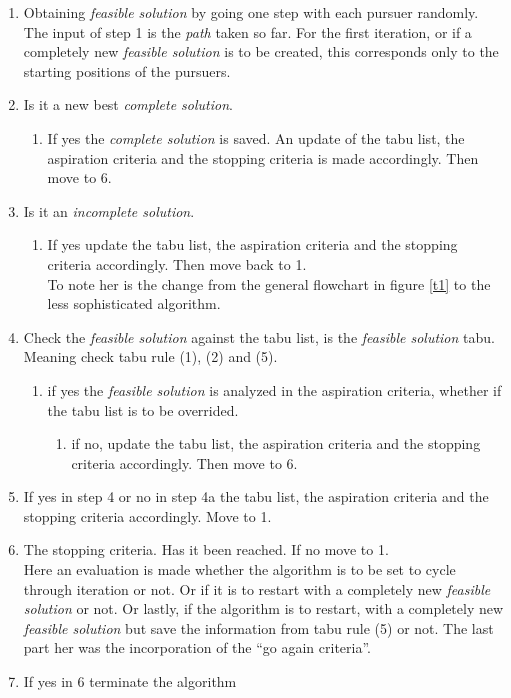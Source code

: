 \begin{enumerate}
\item{}Obtaining \emph{feasible solution} by going one step with each pursuer randomly. \vspace{0,1cm}\\ 
The input of step 1 is the \emph{path} taken so far. For the first iteration, or if a completely new \emph{feasible solution} is to be created, this corresponds only to the starting positions of the pursuers. 
\item{} Is it a new best \emph{complete solution}.
\begin{enumerate}
\item{} If yes the \emph{complete solution} is saved. An update of the tabu list, the aspiration criteria and the stopping criteria is made accordingly. Then move to 6.
\end{enumerate}
\item{} Is it an \emph{incomplete solution}.
\begin{enumerate}
\item{} If yes update the tabu list, the aspiration criteria and the stopping criteria accordingly. Then move back to 1. \vspace{0,1cm}\\
To note her is the change from the general flowchart in figure \ref{t1} to the less sophisticated algorithm. 
\end{enumerate}
\item{} Check the \emph{feasible solution} against the tabu list, is the \emph{feasible solution} tabu. \vspace{0,1cm}\\
Meaning check tabu rule (1), (2) and (5).
\begin{enumerate}
\item{} if yes the \emph{feasible solution} is analyzed in the aspiration criteria, whether if the tabu list is to be overrided.
 \begin{enumerate}
\item{} if no, update the tabu list, the aspiration criteria and the stopping criteria accordingly. Then move to 6.
\end{enumerate}
\end{enumerate}
\item{} If yes in step 4 or no in step 4a the tabu list, the aspiration criteria and the stopping criteria accordingly. Move to 1.
\item{} The stopping criteria. Has it been reached. If no move to 1. \vspace{0,1cm}\\
Here an evaluation is made whether the algorithm is to be set to cycle through iteration or not. Or if it is to restart with a completely new \emph{feasible solution} or not. 
Or lastly, if the algorithm is to restart, with a completely new \emph{feasible solution} but save the information from tabu rule (5) or not. The last part her was the incorporation of the ``go again criteria''.
\item{} If yes in 6 terminate the algorithm
\end{enumerate}

